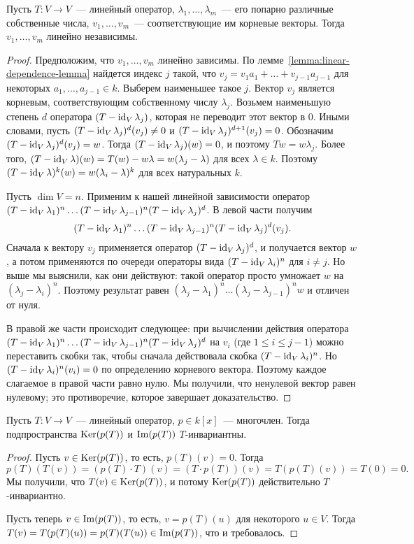 \begin{theorem}\label{thm:gen-eigenvectors-are-independent}
Пусть $T\colon V\to V$~--- линейный оператор,
$\lambda_1,\dots,\lambda_m$~--- его попарно различные собственные
числа, $v_1,\dots,v_m$~--- соответствующие им корневые векторы.
Тогда $v_1,\dots,v_m$ линейно независимы.
\end{theorem}
\begin{proof}
Предположим, что $v_1,\dots,v_m$ линейно зависимы. По
лемме~\ref{lemma:linear-dependence-lemma} найдется индекс
$j$ такой, что $v_j = v_1a_1 + \dots + v_{j-1}a_{j-1}$
для некоторых $a_1,\dots,a_{j-1}\in k$. Выберем наименьшее
такое $j$.
Вектор $v_j$ является корневым, соответствующим собственному числу
$\lambda_j$. Возьмем наименьшую степень $d$
оператора $(T-\operatorname{id}_V\lambda_j)$, которая не переводит этот вектор в $0$.
Иными словами, пусть $(T-\operatorname{id}_V\lambda_j)^d(v_j)\neq 0$
и $(T-\operatorname{id}_V\lambda_j)^{d+1}(v_j) = 0$.
Обозначим $(T-\operatorname{id}_V\lambda_j)^d(v_j) = w$.
Тогда $(T-\operatorname{id}_V\lambda_j)(w) = 0$, и поэтому $Tw = w\lambda_j$.
Более того, $(T-\operatorname{id}_V\lambda)(w) = T(w) - w\lambda
= w(\lambda_j - \lambda)$ для всех $\lambda\in k$.
Поэтому $(T-\operatorname{id}_V\lambda)^k(w) = w(\lambda_i-\lambda)^k$
для всех натуральных $k$.

Пусть $\dim V = n$.
Применим к нашей линейной зависимости оператор
$(T-\operatorname{id}_V\lambda_1)^n\dots(T-\operatorname{id}_V\lambda_{j-1})^n(T-\operatorname{id}_V\lambda_j)^d$.
В левой части получим
$$
(T-\operatorname{id}_V\lambda_1)^n\dots(T-\operatorname{id}_V\lambda_{j-1})^n(T-\operatorname{id}_V\lambda_j)^d(v_j).
$$
Сначала к вектору $v_j$ применяется оператор $(T-\operatorname{id}_V\lambda_j)^d$,
и получается вектор $w$, а потом применяются по очереди
операторы вида $(T-\operatorname{id}_V\lambda_i)^n$ для $i\neq j$.
Но выше мы выяснили, как они действуют: такой оператор
просто умножает $w$ на $(\lambda_j - \lambda_i)^n$.
Поэтому результат равен
$(\lambda_j-\lambda_1)^n\dots(\lambda_j-\lambda_{j-1})^n w$
и отличен от нуля.

В правой же части происходит следующее: при вычислении
действия оператора $(T-\operatorname{id}_V\lambda_1)^n\dots(T-\operatorname{id}_V\lambda_{j-1})^n
(T-\operatorname{id}_V\lambda_j)^d$ на $v_i$ (где $1\leq i\leq j-1$)
можно переставить скобки так, чтобы сначала действовала
скобка $(T-\operatorname{id}_V\lambda_i)^n$. Но $(T-\operatorname{id}_V\lambda_i)^n(v_i) = 0$
по определению корневого вектора. Поэтому каждое слагаемое
в правой части равно нулю.
Мы получили, что ненулевой вектор равен нулевому; это противоречие,
которое завершает доказательство.
\end{proof}

\begin{lemma}\label{lemma:poly-ker-and-im-are-invariant}
Пусть $T\colon V\to V$~--- линейный оператор,
$p\in k[x]$~--- многочлен. Тогда подпространства
$\operatorname{Ker}(p(T))$ и $\operatorname{Im}(p(T))$ $T$-инвариантны.
\end{lemma}
\begin{proof}
Пусть $v\in\operatorname{Ker}(p(T))$, то есть, $p(T)(v)=0$.
Тогда
$$
p(T)(T(v)) = (p(T)\cdot T)(v) = (T\cdot p(T))(v) = T(p(T)(v))
= T(0) = 0.
$$
Мы получили, что $T(v)\in\operatorname{Ker}(p(T))$, и потому $\operatorname{Ker}(p(T))$
действительно $T$-инвариантно.

Пусть теперь $v\in\operatorname{Im}(p(T))$, то есть,
$v = p(T)(u)$ для некоторого $u\in V$.
Тогда $T(v) = T(p(T)(u)) = p(T)(T(u)) \in\operatorname{Im}(p(T))$,
что и требовалось.
\end{proof}

